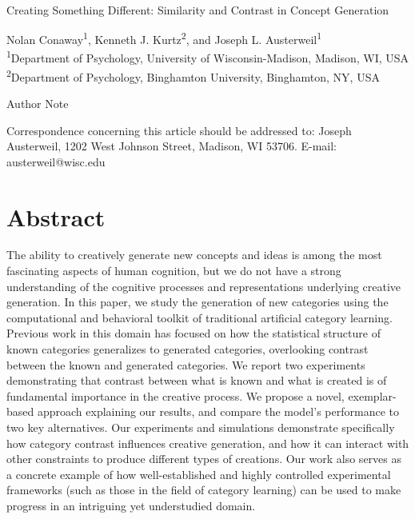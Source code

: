 \documentclass[12pt]{article}
\begin{document}
\begin{center}
\hfill
\\[1in]

Creating Something Different: Similarity and Contrast in Concept Generation


\vfill

Nolan Conaway\textsuperscript{1}, 
Kenneth J. Kurtz\textsuperscript{2}, 
and Joseph L. Austerweil\textsuperscript{1}
\\[\baselineskip]
\textsuperscript{1}Department of Psychology, University of Wisconsin-Madison, Madison, WI, USA
\textsuperscript{2}Department of Psychology, Binghamton University, Binghamton, NY, USA
\\[1in]

\vfill

Author Note

Correspondence concerning this article should be addressed to: 
Joseph Austerweil, 1202 West Johnson Street, Madison, WI 53706.
E-mail: austerweil@wisc.edu

\end{center}
\clearpage


\doublespacing
\section*{Abstract}

The ability to creatively generate new concepts and ideas is among the most fascinating aspects of human cognition, but we do not have a strong understanding of the cognitive processes and representations underlying creative generation. In this paper, we study the generation of new categories using the computational and behavioral toolkit of traditional artificial category learning. Previous work in this domain has focused on how the statistical structure of known categories generalizes to generated categories, overlooking contrast between the known and generated categories. We report two experiments demonstrating that contrast between what is known and what is created is of fundamental importance in the creative process. We propose a novel, exemplar-based approach explaining our results, and compare the model's performance to two key alternatives. Our experiments and simulations demonstrate specifically how category contrast influences creative generation, and how it can interact with other constraints to produce different types of creations. Our work also serves as a concrete example of how well-established and highly controlled experimental frameworks (such as those in the field of category learning) can be used to make progress in an intriguing yet understudied domain.
\end{document}
